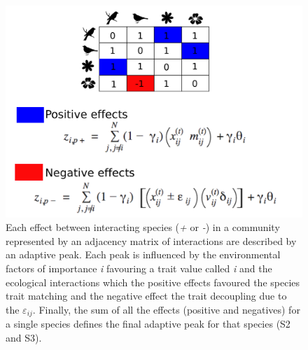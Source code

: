 \documentclass[a4paper, 12pt]{article}
\begin{document}
\begin{singlespace}
\begin{figure}[H]
  \centering
  \includegraphics[width=\linewidth]{Sup_Figura_1.pdf}
  \vspace*{-7mm}
  \caption{Each effect between interacting species (\textit{+} or \textit{-}) in a community represented by an adjacency matrix of interactions are described by an adaptive peak. Each peak is influenced by the environmental factors of importance \textit{i} favouring a trait value called \textit{i} and the ecological interactions which the positive effects favoured the species trait matching and the negative effect the trait decoupling due to the $\varepsilon_{ij}$. Finally, the sum of all the effects (positive and negatives) for a single species defines the final adaptive peak for that species (S2 and S3).}
  \label{supfig:1}
\end{figure}


\end{singlespace}
\end{document}
